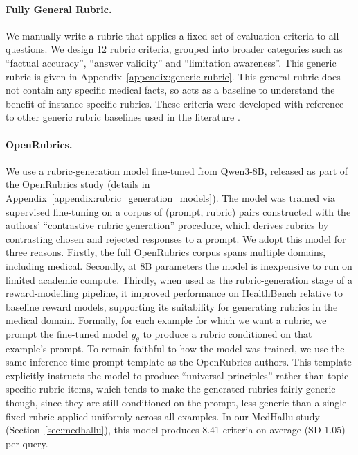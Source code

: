 \documentclass{article}
\begin{document}
\paragraph{Fully General Rubric.} We manually write a rubric that applies a fixed set of evaluation criteria to all questions. We design 12 rubric criteria, grouped into broader categories such as ``factual accuracy'', ``answer validity'' and ``limitation awareness''. This generic rubric is given in Appendix~\ref{appendix:generic-rubric}. This general rubric does not contain any specific medical facts, so acts as a baseline to understand the benefit of instance specific rubrics. These criteria were developed with reference to other generic rubric baselines used in the literature \citep{arorahealthbench2025, chen_automated_2026}. 

\paragraph{OpenRubrics.}\label{sec:openrubrics}
We use a rubric-generation model fine-tuned from Qwen3-8B, released as part of the OpenRubrics study \citep{liu2026openrubricsscalablesyntheticrubric} (details in Appendix~\ref{appendix:rubric_generation_models}). The model was trained via supervised fine-tuning on a corpus of (prompt, rubric) pairs constructed with the authors' ``contrastive rubric generation'' procedure, which derives rubrics by contrasting chosen and rejected responses to a prompt. We adopt this model for three reasons. Firstly, the full OpenRubrics corpus spans multiple domains, including medical. Secondly, at 8B parameters the model is inexpensive to run on limited academic compute. Thirdly, when used as the rubric-generation stage of a reward-modelling pipeline, it improved performance on HealthBench relative to baseline reward models, supporting its suitability for generating rubrics in the medical domain. Formally, for each example for which we want a rubric, we prompt the fine-tuned model $g_\theta$ to produce a rubric conditioned on that example's prompt. To remain faithful to how the model was trained, we use the same inference-time prompt template as the OpenRubrics authors. This template explicitly instructs the model to produce ``universal principles'' rather than topic-specific rubric items, which tends to make the generated rubrics fairly generic — though, since they are still conditioned on the prompt, less generic than a single fixed rubric applied uniformly across all examples. In our MedHallu study (Section~\ref{sec:medhallu}), this model produces 8.41 criteria on average (SD 1.05) per query.
\end{document}
